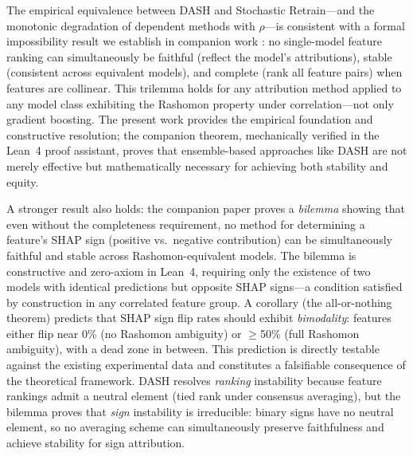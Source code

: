 \documentclass[11pt]{article}
\newcommand{\dash}{\textsc{DASH}}
\newcommand{\rhovar}{\rho}
\begin{document}
The empirical equivalence between \dash{} and Stochastic Retrain---and
the monotonic degradation of dependent methods with
$\rhovar$---is consistent with a formal impossibility result we
establish in companion work \citep{caraker2026impossibility}: no
single-model feature ranking can simultaneously be faithful (reflect
the model's attributions), stable (consistent across equivalent models),
and complete (rank all feature pairs) when features are collinear.
This trilemma holds for any attribution method applied to any model
class exhibiting the Rashomon property under correlation---not only
gradient boosting. The present work provides the empirical foundation
and constructive resolution; the companion theorem, mechanically
verified in the Lean~4 proof assistant, proves that ensemble-based
approaches like \dash{} are not merely effective but mathematically
necessary for achieving both stability and equity.

A stronger result also holds: the companion paper proves a
\emph{bilemma} showing that even without the completeness requirement,
no method for determining a feature's SHAP sign (positive vs.\
negative contribution) can be simultaneously faithful and stable
across Rashomon-equivalent models.  The bilemma is constructive and
zero-axiom in Lean~4, requiring only the existence of two models with
identical predictions but opposite SHAP signs---a condition satisfied
by construction in any correlated feature group.  A corollary (the
all-or-nothing theorem) predicts that SHAP sign flip rates should
exhibit \emph{bimodality}: features either flip near 0\% (no
Rashomon ambiguity) or $\geq$50\% (full Rashomon ambiguity), with a
dead zone in between.  This prediction is directly testable against
the existing experimental data and constitutes a falsifiable
consequence of the theoretical framework.
\dash{} resolves \emph{ranking} instability because feature rankings
admit a neutral element (tied rank under consensus averaging), but the
bilemma proves that \emph{sign} instability is irreducible: binary
signs have no neutral element, so no averaging scheme can simultaneously
preserve faithfulness and achieve stability for sign attribution.
\end{document}
